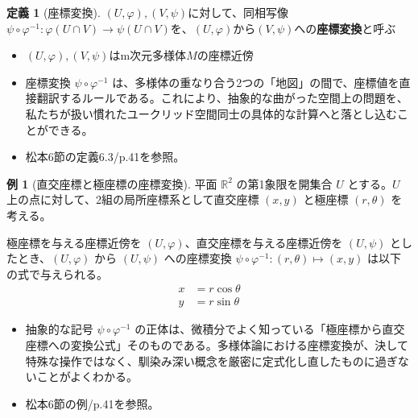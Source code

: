 \documentclass[paper=a4, fontsize=11pt]{jlreq} %
\theoremstyle{definition}
\newtheorem{definition}[theorem]{定義}
\newtheorem{example}[theorem]{例}
\begin{document}
\begin{definition}[座標変換]
    $(U,\varphi),(V,\psi)$に対して、同相写像$\psi\circ\varphi^{-1}:\varphi(U\cap V)\to\psi(U\cap V)$を、$(U,\varphi)$から$(V,\psi)$への\textbf{座標変換}と呼ぶ
    \begin{itemize}
        \item[\textbf{Type:}] $(U,\varphi),(V,\psi)$はm次元多様体$M$の座標近傍
        \item[\textbf{Insight:}] 座標変換 $\psi \circ \varphi^{-1}$ は、多様体の重なり合う2つの「地図」の間で、座標値を直接翻訳するルールである。これにより、抽象的な曲がった空間上の問題を、私たちが扱い慣れたユークリッド空間同士の具体的な計算へと落とし込むことができる。
        \item[\textbf{Link:}] 松本6節の定義6.3/p.41を参照。
    \end{itemize}
\end{definition}

\begin{example}[直交座標と極座標の座標変換]
    平面 $\mathbb{R}^2$ の第1象限を開集合 $U$ とする。$U$ 上の点に対して、2組の局所座標系として直交座標 $(x,y)$ と極座標 $(r,\theta)$ を考える。
    
    極座標を与える座標近傍を $(U, \varphi)$、直交座標を与える座標近傍を $(U, \psi)$ としたとき、$(U, \varphi)$ から $(U, \psi)$ への座標変換 $\psi \circ \varphi^{-1} : (r, \theta) \mapsto (x, y)$ は以下の式で与えられる。
    \begin{align*}
        x &= r \cos \theta \\
        y &= r \sin \theta
    \end{align*}
    
    \begin{itemize}
        \item[\textbf{Insight:}] 抽象的な記号 $\psi \circ \varphi^{-1}$ の正体は、微積分でよく知っている「極座標から直交座標への変換公式」そのものである。多様体論における座標変換が、決して特殊な操作ではなく、馴染み深い概念を厳密に定式化し直したものに過ぎないことがよくわかる。
        \item[\textbf{Link:}] 松本6節の例/p.41を参照。
    \end{itemize}
\end{example}
\end{document}

